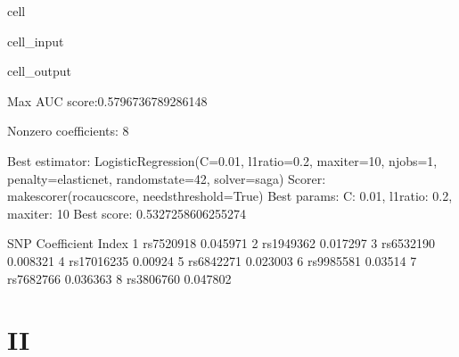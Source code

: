 \documentclass[letterpaper,10pt,english]{jupyterBook}
\begin{document}
\begin{sphinxuseclass}{cell}
\begin{sphinxVerbatimInput}
\begin{sphinxuseclass}{cell_input}
\end{sphinxuseclass}\end{sphinxVerbatimInput}
\begin{sphinxVerbatimOutput}

\begin{sphinxuseclass}{cell_output}
\begin{sphinxVerbatim}[commandchars=\\\{\}]
Max AUC score:0.5796736789286148

Non\PYGZhy{}zero coefficients: 8

Best estimator: LogisticRegression(C=0.01, l1\PYGZus{}ratio=0.2, max\PYGZus{}iter=10, n\PYGZus{}jobs=\PYGZhy{}1,
                   penalty=\PYGZsq{}elasticnet\PYGZsq{}, random\PYGZus{}state=42, solver=\PYGZsq{}saga\PYGZsq{})
Scorer: make\PYGZus{}scorer(roc\PYGZus{}auc\PYGZus{}score, needs\PYGZus{}threshold=True)
Best params: \PYGZob{}\PYGZsq{}C\PYGZsq{}: 0.01, \PYGZsq{}l1\PYGZus{}ratio\PYGZsq{}: 0.2, \PYGZsq{}max\PYGZus{}iter\PYGZsq{}: 10\PYGZcb{}
Best score: 0.5327258606255274
\end{sphinxVerbatim}

\begin{sphinxVerbatim}[commandchars=\\\{\}]
              SNP Coefficient
Index                        
1       rs7520918   \PYGZhy{}0.045971
2       rs1949362   \PYGZhy{}0.017297
3       rs6532190    0.008321
4      rs17016235     0.00924
5       rs6842271    0.023003
6       rs9985581     0.03514
7       rs7682766    0.036363
8       rs3806760    0.047802
\end{sphinxVerbatim}

\end{sphinxuseclass}\end{sphinxVerbatimOutput}

\end{sphinxuseclass}

\section{II}
\label{\detokenize{Cooper:ii}}
\end{document}
